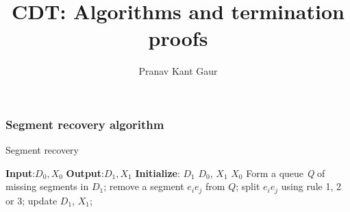 \documentclass{beamer}
\title[CDT]{CDT: Algorithms and termination proofs}
\author{Pranav Kant Gaur}
\institute[BARC, India]{Computer Division, \newline Bhabha Atomic Research Centre, Mumbai, India}
\date{}
\begin{document}
\begin{frame}
  \titlepage
\end{frame}

\begin{frame}
\frametitle{Segment recovery algorithm}
\begin{algorithm}[H]
\caption{Segment recovery}\label{euclid}
\begin{algorithmic}[1]
	\State \textbf{Input}:$D_0, X_0$
	\State \textbf{Output}:$D_1, X_1$
	\State \textbf{Initialize}:
	\State $D_1$ \gets $D_0$, $X_1$ \gets $X_0$
	\Repeat
	\State Form a queue \textit{Q} of missing segments in $D_1$;
	\State remove a segment $e_{i}e_{j}$ from $Q$;
	\State split $e_{i}e_{j}$ using rule 1, 2 or 3;
	\State update $D_1$, $X_1$;
	\EndWhile
\EndProcedure
\end{algorithmic}
\end{algorithm}
\end{frame}
\end{document}
